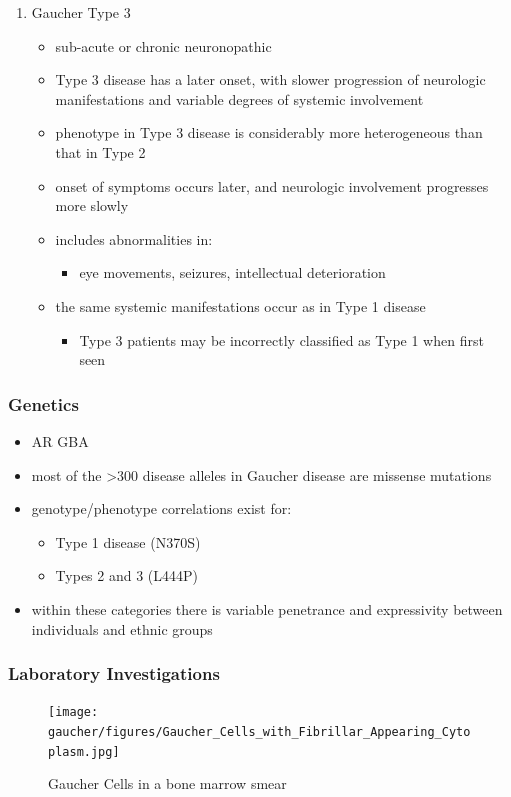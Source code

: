 \documentclass[12pt]{scrartcl}
\begin{document}
\begin{enumerate}
\item Gaucher Type 3
\label{sec:org8475846}
\begin{itemize}
\item sub-acute or chronic neuronopathic
\item Type 3 disease has a later onset, with slower progression of
neurologic manifestations and variable degrees of systemic
involvement
\item phenotype in Type 3 disease is considerably more
heterogeneous than that in Type 2
\item onset of symptoms occurs later, and neurologic involvement
progresses more slowly
\item includes abnormalities in:
\begin{itemize}
\item eye movements, seizures, intellectual deterioration
\end{itemize}
\item the same systemic manifestations occur as in Type 1 disease
\begin{itemize}
\item Type 3 patients may be incorrectly classified as Type 1 when
first seen
\end{itemize}
\end{itemize}
\end{enumerate}

\subsubsection{Genetics}
\label{sec:orgce8b2a4}
\begin{itemize}
\item AR GBA
\item most of the >300 disease alleles in Gaucher disease are missense
mutations
\item genotype/phenotype correlations exist for:
\begin{itemize}
\item Type 1 disease (N370S)
\item Types 2 and 3 (L444P)
\end{itemize}
\item within these categories there is variable penetrance and
expressivity between individuals and ethnic groups
\end{itemize}
\subsubsection{Laboratory Investigations}
\label{sec:org93e1346}
\begin{figure}[htbp]
\centering
\texttt{[image: gaucher/figures/Gaucher\_Cells\_with\_Fibrillar\_Appearing\_Cytoplasm.jpg]}
\caption{\label{fig:org68fbbf3}Gaucher Cells in a bone marrow smear}
\end{figure}
\end{document}
